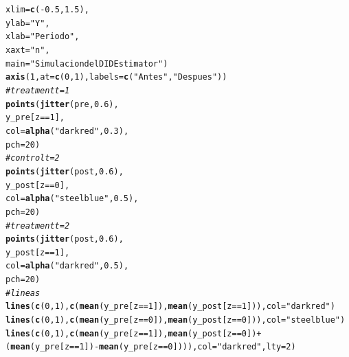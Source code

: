 \documentclass[onesided]{article}\usepackage[]{graphicx}\usepackage[]{color}
\makeatletter
\newcommand{\hlnum}[1]{\textcolor[rgb]{0.686,0.059,0.569}{#1}}%
\newcommand{\hlstr}[1]{\textcolor[rgb]{0.192,0.494,0.8}{#1}}%
\newcommand{\hlcom}[1]{\textcolor[rgb]{0.678,0.584,0.686}{\textit{#1}}}%
\newcommand{\hlopt}[1]{\textcolor[rgb]{0,0,0}{#1}}%
\newcommand{\hlstd}[1]{\textcolor[rgb]{0.345,0.345,0.345}{#1}}%
\newcommand{\hlkwc}[1]{\textcolor[rgb]{0.333,0.667,0.333}{#1}}%
\newcommand{\hlkwd}[1]{\textcolor[rgb]{0.737,0.353,0.396}{\textbf{#1}}}%
\newenvironment{kframe}{%
 \def\at@end@of@kframe{}%
 \ifinner\ifhmode%
  \def\at@end@of@kframe{\end{minipage}}%
  \begin{minipage}{\columnwidth}%
 \fi\fi%
 \def\FrameCommand##1{\hskip\@totalleftmargin \hskip-\fboxsep
 \colorbox{shadecolor}{##1}\hskip-\fboxsep
     \hskip-\linewidth \hskip-\@totalleftmargin \hskip\columnwidth}%
 \MakeFramed {\advance\hsize-\width
   \@totalleftmargin\z@ \linewidth\hsize
   \@setminipage}}%
 {\par\unskip\endMakeFramed%
 \at@end@of@kframe}
\newenvironment{knitrout}{}{} %
\makeatother
\begin{document}
\begin{knitrout}
\begin{kframe}
\begin{alltt}
     \hlkwc{xlim} \hlstd{=} \hlkwd{c}\hlstd{(}\hlopt{-}\hlnum{0.5}\hlstd{,} \hlnum{1.5}\hlstd{),}
     \hlkwc{ylab} \hlstd{=} \hlstr{"Y"}\hlstd{,}
     \hlkwc{xlab} \hlstd{=} \hlstr{"Periodo"}\hlstd{,}
     \hlkwc{xaxt} \hlstd{=} \hlstr{"n"}\hlstd{,}
     \hlkwc{main} \hlstd{=} \hlstr{"Simulacion del DID Estimator"}\hlstd{)}
\hlkwd{axis}\hlstd{(}\hlnum{1}\hlstd{,} \hlkwc{at} \hlstd{=} \hlkwd{c}\hlstd{(}\hlnum{0}\hlstd{,} \hlnum{1}\hlstd{),} \hlkwc{labels} \hlstd{=} \hlkwd{c}\hlstd{(}\hlstr{"Antes"}\hlstd{,} \hlstr{"Despues"}\hlstd{))}
\hlcom{# treatment t=1}
\hlkwd{points}\hlstd{(}\hlkwd{jitter}\hlstd{(pre,} \hlnum{0.6}\hlstd{),}
       \hlstd{y_pre[z} \hlopt{==} \hlnum{1}\hlstd{],}
       \hlkwc{col} \hlstd{=} \hlkwd{alpha}\hlstd{(}\hlstr{"darkred"}\hlstd{,} \hlnum{0.3}\hlstd{),}
       \hlkwc{pch} \hlstd{=} \hlnum{20}\hlstd{)}
\hlcom{# control t=2}
\hlkwd{points}\hlstd{(}\hlkwd{jitter}\hlstd{(post,} \hlnum{0.6}\hlstd{),}
       \hlstd{y_post[z} \hlopt{==} \hlnum{0}\hlstd{],}
       \hlkwc{col} \hlstd{=} \hlkwd{alpha}\hlstd{(}\hlstr{"steelblue"}\hlstd{,} \hlnum{0.5}\hlstd{),}
       \hlkwc{pch} \hlstd{=} \hlnum{20}\hlstd{)}
\hlcom{# treatment t=2}
\hlkwd{points}\hlstd{(}\hlkwd{jitter}\hlstd{(post,} \hlnum{0.6}\hlstd{),}
       \hlstd{y_post[z} \hlopt{==} \hlnum{1}\hlstd{],}
       \hlkwc{col} \hlstd{=} \hlkwd{alpha}\hlstd{(}\hlstr{"darkred"}\hlstd{,} \hlnum{0.5}\hlstd{),}
       \hlkwc{pch} \hlstd{=} \hlnum{20}\hlstd{)}
\hlcom{# lineas}
\hlkwd{lines}\hlstd{(}\hlkwd{c}\hlstd{(}\hlnum{0}\hlstd{,} \hlnum{1}\hlstd{),} \hlkwd{c}\hlstd{(}\hlkwd{mean}\hlstd{(y_pre[z} \hlopt{==} \hlnum{1}\hlstd{]),} \hlkwd{mean}\hlstd{(y_post[z} \hlopt{==} \hlnum{1}\hlstd{])),} \hlkwc{col} \hlstd{=} \hlstr{"darkred"}\hlstd{)}
\hlkwd{lines}\hlstd{(}\hlkwd{c}\hlstd{(}\hlnum{0}\hlstd{,} \hlnum{1}\hlstd{),} \hlkwd{c}\hlstd{(}\hlkwd{mean}\hlstd{(y_pre[z} \hlopt{==} \hlnum{0}\hlstd{]),} \hlkwd{mean}\hlstd{(y_post[z} \hlopt{==} \hlnum{0}\hlstd{])),} \hlkwc{col} \hlstd{=} \hlstr{"steelblue"}\hlstd{)}
\hlkwd{lines}\hlstd{(}\hlkwd{c}\hlstd{(}\hlnum{0}\hlstd{,} \hlnum{1}\hlstd{),} \hlkwd{c}\hlstd{(}\hlkwd{mean}\hlstd{(y_pre[z} \hlopt{==} \hlnum{1}\hlstd{]),} \hlkwd{mean}\hlstd{(y_post[z} \hlopt{==} \hlnum{0}\hlstd{])} \hlopt{+}
\hlstd{(}\hlkwd{mean}\hlstd{(y_pre[z} \hlopt{==} \hlnum{1}\hlstd{])}\hlopt{-}\hlkwd{mean}\hlstd{(y_pre[z} \hlopt{==} \hlnum{0}\hlstd{]))),} \hlkwc{col} \hlstd{=} \hlstr{"darkred"}\hlstd{,} \hlkwc{lty} \hlstd{=} \hlnum{2}\hlstd{)}
\end{alltt}
\end{kframe}


\end{knitrout}
\end{document}
